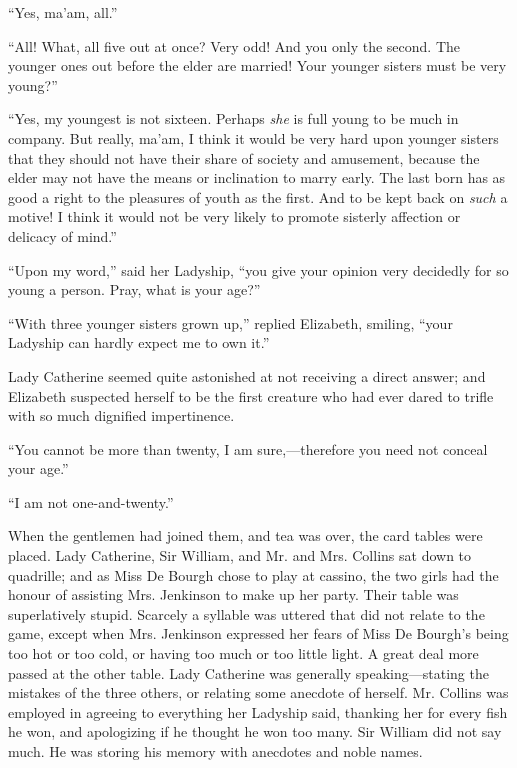 \documentclass[12pt,openright]{book}
\begin{document}
“Yes, ma’am, all.”

“All! What, all five out at once? Very odd! And you only the second. The younger ones out before the elder are married! Your younger sisters must be very young?”

“Yes, my youngest is not sixteen. Perhaps \textit{she} is full young to be much in company. But really, ma’am, I think it would be very hard upon younger sisters that they should not have their share of society and amusement, because the elder may not have the means or inclination to marry early. The last born has as good a right to the pleasures of youth as the first. And to be kept back on \textit{such} a motive! I think it would not be very likely to promote sisterly affection or delicacy of mind.”

“Upon my word,” said her Ladyship, “you give your opinion very decidedly for so young a person. Pray, what is your age?”

“With three younger sisters grown up,” replied Elizabeth, smiling, “your Ladyship can hardly expect me to own it.”

Lady Catherine seemed quite astonished at not receiving a direct answer; and Elizabeth suspected herself to be the first creature who had ever dared to trifle with so much dignified impertinence.

“You cannot be more than twenty, I am sure,—therefore you need not conceal your age.”

“I am not one-and-twenty.”

When the gentlemen had joined them, and tea was over, the card tables were placed. Lady Catherine, Sir William, and Mr. and Mrs. Collins sat down to quadrille; and as Miss De Bourgh chose to play at cassino, the two girls had the honour of assisting Mrs. Jenkinson to make up her party. Their table was superlatively stupid. Scarcely a syllable was uttered that did not relate to the game, except when Mrs. Jenkinson expressed her fears of Miss De Bourgh’s being too hot or too cold, or having too much or too little light. A great deal more passed at the other table. Lady Catherine was generally speaking—stating the mistakes of the three others, or relating some anecdote of herself. Mr. Collins was employed in agreeing to everything her Ladyship said, thanking her for every fish he won, and apologizing if he thought he won too many. Sir William did not say much. He was storing his memory with anecdotes and noble names.
\end{document}
